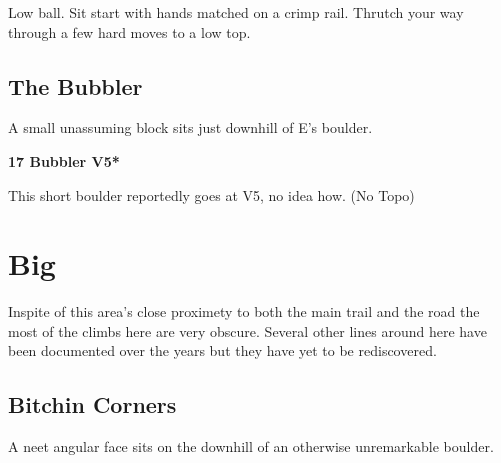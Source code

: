 \begin{multicols}{2}
\begin{minipage}{\linewidth}
					\begin{adjustwidth}{0.5cm}{}				
					Low ball. Sit start with hands matched on a crimp rail. Thrutch your way through a few hard moves to a low top.
					\end{adjustwidth}
					\end{minipage}
			\begin{minipage}{\columnwidth}
			\subsection*{The Bubbler}\label{bf:The Bubbler}
			A small unassuming block sits just downhill of E's boulder.
			
			\end{minipage}
			
					\begin{minipage}{\linewidth}	
					\label{rt:Bubbler}
\colorbox{RoyalBlue!20}{
\parbox{0.95\textwidth}{
\textbf{
17 Bubbler V5*  
}
}
}

					\begin{adjustwidth}{0.5cm}{}				
					This short boulder reportedly goes at V5, no idea how.
						\newline (No Topo) 
					\end{adjustwidth}
					\end{minipage}
\newpage

		\section{Big}\label{sa:Big}
	\begin{minipage}{\columnwidth}
	Inspite of this area's close proximety to both the main trail and the road the most of the climbs here are very obscure. Several other lines around here have been documented over the years but they have yet to be rediscovered.
	\end{minipage}
	
			\begin{minipage}{\columnwidth}
			\subsection*{Bitchin Corners}\label{bf:Bitchin Corners}
			A neet angular face sits on the downhill of an otherwise unremarkable boulder.
			
			\end{minipage}
			


\end{multicols}

